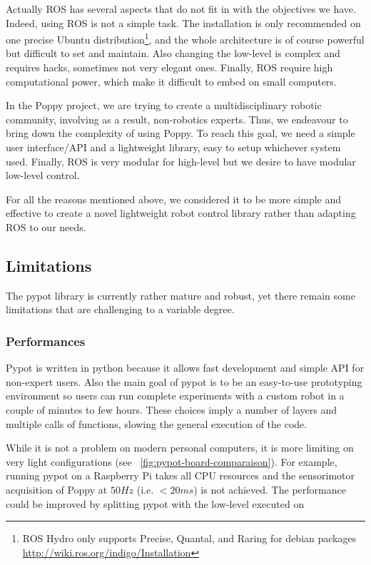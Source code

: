 Actually ROS has several aspects that do not fit in with the objectives we have. Indeed, using ROS is not a simple task. The installation is only recommended on one precise Ubuntu distribution\footnote{ROS Hydro only supports Precise, Quantal, and Raring for debian packages \url{http://wiki.ros.org/indigo/Installation}}, and the whole architecture is of course powerful but difficult to set and maintain. Also changing the low-level is complex and requires hacks, sometimes not very elegant ones. Finally, ROS require high computational power, which make it difficult to embed on small computers.

In the Poppy project, we are trying to create a multidisciplinary robotic community, involving as a result, non-robotics experts. Thus, we endeavour to bring down the complexity of using Poppy. To reach this goal, we need a simple user interface/API and a lightweight library, easy to setup whichever system used. Finally, ROS is very modular for high-level but we desire to have modular low-level control.

For all the reasons mentioned above, we considered it to be more simple and effective to create a novel lightweight robot control library rather than adapting ROS to our needs.


\subsection{Limitations} %

The pypot library is currently rather mature and robust, yet there remain some limitations that are challenging to a variable degree.

\subsubsection{Performances}
\label{sub:pypot-performance}

Pypot is written in python because it allows fast development and simple API for non-expert users. Also the main goal of pypot is to be an easy-to-use prototyping environment so users can run complete experiments with a custom robot in a couple of minutes to few hours. These choices imply a number of layers and multiple calls of functions, slowing the general execution of the code.

While it is not a problem on modern personal computers, it is more limiting on very light configurations (see \figurename~\ref{fig:pypot-board-comparaison}). For example, running pypot on a Raspberry Pi takes all CPU resources and the sensorimotor acquisition of Poppy at $50Hz$ (i.e. $<20ms$) is not achieved.
The performance could be improved by splitting pypot with the low-level executed on


